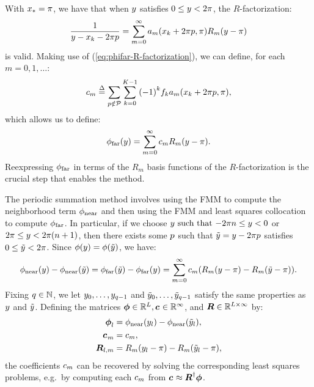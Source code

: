 With ${x}_{*} = \pi$, we have that when $y$ satisfies
$0 \leq y < 2\pi$, the $R$-factorization:
\begin{align}
  \label{eq:phifar-R-factorization}
  \frac{1}{y - {x}_{k} - 2\pi p} = \sum_{m{}=0}^{\infty}a_m({x}_{k} + 2\pi p, \pi)R_m(y - \pi)
\end{align}
is valid. Making use of (\ref{eq:phifar-R-factorization}), we can
define, for each $m = 0, 1, \hdots$:
\begin{align}
  \label{eq:phifar-over-R-coefs}
  {c}_{m} \overset{\Delta}{=} \sum_{p\notin\mathcal{P}}\sum_{{k{}}=0}^{K{}-1} {(-1)}^k {f}_{k} a_m({x}_{k} + 2\pi p, \pi),
\end{align}
which allows us to define:
\begin{align}
  \label{eq:phifar-over-R}
  \phi_{\operatorname{far}}(y) = \sum_{m=0}^\infty {c}_{m} R_m(y - \pi).
\end{align}
Reexpressing $\phi_{\operatorname{far}}$ in terms of the $R_m$ basis functions of the
$R$-factorization is the crucial step that enables the method.

The periodic summation method involves using the FMM to compute the
neighborhood term $\phi_{\operatorname{near}}$ and then using the FMM and least squares
collocation to compute $\phi_{\operatorname{far}}$. In particular, if we choose
$y \mbox{ such that } {-2\pi n} \leq y < 0$ or
$2\pi \leq y < 2\pi(n + 1)$, then there exists
some $p$ such that ${\tilde{y}} = y - 2\pi p$
satisfies $0 \leq {\tilde{y}} < 2\pi$. Since
$\phi(y) = \phi({\tilde{y}})$, we have:
\begin{align}
  \label{eq:phinear-minus-phinear}
  \phi_{\operatorname{near}}(y) - \phi_{\operatorname{near}}({\tilde{y}}) = \phi_{\operatorname{far}}({\tilde{y}}) - \phi_{\operatorname{far}}(y) = \sum_{m=0}^\infty {c}_{m}(R_m(y - \pi) - R_m({\tilde{y}} - \pi)).
\end{align}
Fixing $q\in\mathbb{N}$, we let
$y_0, \hdots, y_{q - 1}$ and
${\tilde{y}}_0, \hdots, {\tilde{y}}_{q - 1}$ satisfy the same
properties as $y$ and ${\tilde{y}}$. Defining the matrices
$\boldsymbol{\phi} \in \mathbb{R}^L, \boldsymbol{{c}_{}} \in \mathbb{R}^\infty$, and
$\boldsymbol{R} \in \mathbb{R}^{L\times\infty}$ by:
\begin{align}
  \boldsymbol{\phi}_l &= \phi_{\operatorname{near}}(y_l) - \phi_{\operatorname{near}}({\tilde{y}}_l), \label{eq:phi-vector} \\
  \boldsymbol{{c}_{}}_m &= {c}_{m}, \label{eq:coef-vector} \\
  \boldsymbol{R}_{l,m} &= R_m(y_l - \pi) - R_m({\tilde{y}}_l - \pi), \label{eq:fitting-matrix}
\end{align}
the coefficients ${c}_{m}$ can be recovered by solving the
corresponding least squares problems, e.g.\ by computing each
${c}_{m}$ from
$\boldsymbol{{c}_{}} \approx \boldsymbol{R}^\dagger \boldsymbol{\phi}$.

